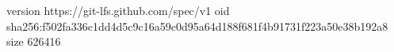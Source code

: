 version https://git-lfs.github.com/spec/v1
oid sha256:f502fa336c1dd4d5c9c16a59c0d95a64d188f681f4b91731f223a50e38b192a8
size 626416
